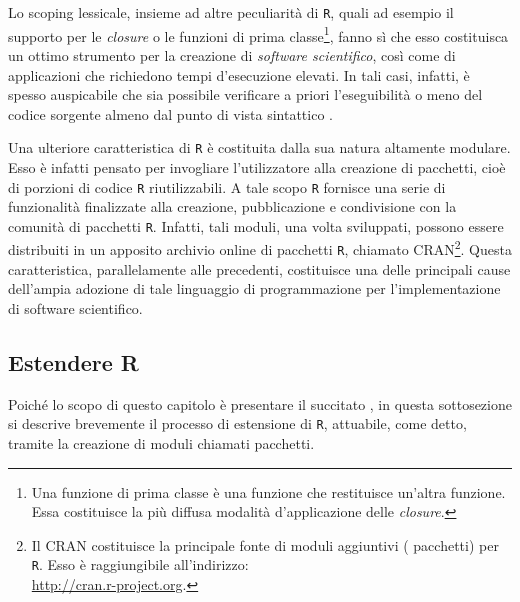 Lo scoping lessicale, insieme ad altre peculiarità di \lstinline$R$, quali ad esempio il supporto per le \emph{closure} o le funzioni di prima classe\footnote{Una funzione di prima classe è una funzione che restituisce un'altra funzione. Essa costituisce la più diffusa modalità d'applicazione delle \emph{closure}.}, fanno sì che esso costituisca un ottimo strumento per la creazione di \emph{software scientifico}, così come di applicazioni che richiedono tempi d'esecuzione elevati. In tali casi, infatti, è spesso auspicabile che sia possibile verificare a priori l'eseguibilità o meno del codice sorgente almeno dal punto di vista sintattico \citep{Oliveira2006}.

Una ulteriore caratteristica di \lstinline$R$ è costituita dalla sua natura altamente modulare. Esso è infatti pensato per invogliare l'utilizzatore alla creazione di pacchetti, cioè di porzioni di codice \lstinline$R$ riutilizzabili. A tale scopo \lstinline$R$ fornisce una serie di funzionalità finalizzate alla creazione, pubblicazione e condivisione con la comunità di pacchetti \lstinline$R$. Infatti, tali moduli, una volta sviluppati, possono essere distribuiti in un apposito archivio online di pacchetti \lstinline$R$, chiamato \acs{CRAN}\footnote{Il \acf{CRAN} costituisce la principale fonte di moduli aggiuntivi (\ie{} pacchetti) per \lstinline$R$. Esso è raggiungibile all'indirizzo: \\ \url{http://cran.r-project.org}.}. Questa caratteristica, parallelamente alle precedenti, costituisce una delle principali cause dell'ampia adozione di tale linguaggio di programmazione per l'implementazione di software scientifico.

\subsection{Estendere R}
Poiché lo scopo di questo capitolo è presentare il succitato \pacchettor{}, in questa sottosezione si descrive brevemente il processo di estensione di \lstinline$R$, attuabile, come detto, tramite la creazione di moduli chiamati pacchetti.

